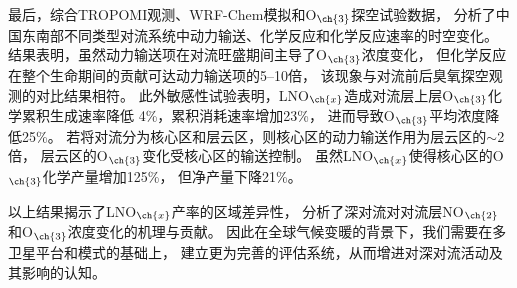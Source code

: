 {最后，综合TROPOMI观测、WRF-Chem模拟和O$_{\ch{3}}$探空试验数据，
分析了中国东南部不同类型对流系统中动力输送、化学反应和化学反应速率的时空变化。
结果表明，虽然动力输送项在对流旺盛期间主导了O$_{\ch{3}}$浓度变化，
但化学反应在整个生命期间的贡献可达动力输送项的5--10倍，
该现象与对流前后臭氧探空观测的对比结果相符。
此外敏感性试验表明，LNO$_{\ch{x}}$造成对流层上层O$_{\ch{3}}$化学累积生成速率降低 4\%，累积消耗速率增加23\%，
进而导致O$_{\ch{3}}$平均浓度降低25\%。
若将对流分为核心区和层云区，则核心区的动力输送作用为层云区的$\sim$2倍，
层云区的O$_{\ch{3}}$变化受核心区的输送控制。
虽然LNO$_{\ch{x}}$使得核心区的O$_{\ch{3}}$化学产量增加125\%，
但净产量下降21\%。

以上结果揭示了LNO$_{\ch{x}}$产率的区域差异性，
分析了深对流对对流层NO$_{\ch{2}}$和O$_{\ch{3}}$浓度变化的机理与贡献。
因此在全球气候变暖的背景下，我们需要在多卫星平台和模式的基础上，
建立更为完善的评估系统，从而增进对深对流活动及其影响的认知。
}
